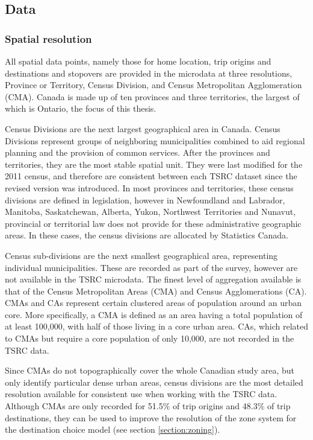 \subsection{Data}
\label{section:tsrcdata}
\subsubsection{Spatial resolution}
All spatial data points, namely those for home location, trip origins and destinations and stopovers are provided in the microdata at three resolutions, Province or Territory, Census Division, and Census Metropolitan Agglomeration (CMA). Canada is made up of ten provinces and three territories, the largest of which is Ontario, the focus of this thesis. 

Census Divisions are the next largest geographical area in Canada. Census Divisions represent groups of neighboring municipalities combined to aid regional planning and the provision of common services. After the provinces and territories, they are the most stable spatial unit. They were last modified for the 2011 census, and therefore are consistent between each TSRC dataset since the revised version was introduced. In most provinces and territories, these census divisions are defined in legislation, however in Newfoundland and Labrador, Manitoba, Saskatchewan, Alberta, Yukon, Northwest Territories and Nunavut, provincial or territorial law does not provide for these administrative geographic areas. In these cases, the census divisions are allocated by Statistics Canada.

Census sub-divisions are the next smallest geographical area, representing individual municipalities. These are recorded as part of the survey, however are not available in the TSRC microdata. The finest level of aggregation available is that of the Census Metropolitan Areas (CMA) and Census Agglomerations (CA). CMAs and CAs represent certain clustered areas of population around an urban core. More specifically, a CMA is defined as an area having a total population of at least 100,000, with half of those living in a core urban area. CAs, which related to CMAs but require a core population of only 10,000, are not recorded in the TSRC data. 

Since CMAs do not topographically cover the whole Canadian study area, but only identify particular dense urban areas, census divisions are the most detailed resolution available for consistent use when working with the TSRC data. Although CMAs are only recorded for 51.5\% of trip origins and 48.3\% of trip destinations, they can be used to improve the resolution of the zone system for the destination choice model (see section \ref{section:zoning}).


